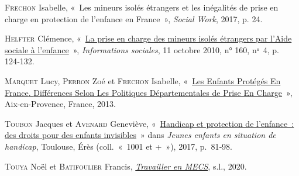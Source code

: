 \documentclass[
  12,
  a4paper,
]{report}
\newlength{\cslhangindent}
\newlength{\cslentryspacingunit} %
\newenvironment{CSLReferences}[2] %
 {%
  \setlength{\parindent}{0pt}
  \ifodd #1
  \let\oldpar\par
  \def\par{\hangindent=\cslhangindent\oldpar}
  \fi
  \setlength{\parskip}{#2\cslentryspacingunit}
 }%
 {}
\begin{document}
\hypertarget{refs}{}
\begin{CSLReferences}{0}{0}
\leavevmode{}%
\textsc{Frechon} Isabelle, {«~Les mineurs isolés étrangers et les
inégalités de prise en charge en protection de l'enfance en France~»},
\emph{Social Work}, 2017, p. 24.

\leavevmode{}%
\textsc{Helfter} Clémence,
{«~\href{http://www.cairn.info/journal-informations-sociales-2010-4-page-124.htm}{La
prise en charge des mineurs isolés étrangers par l'Aide sociale à
l'enfance}~»}, \emph{Informations sociales}, 11 octobre 2010, n° 160,
nᵒ~4, p. 124‑132.

\leavevmode{}%
\textsc{Marquet} Lucy, \textsc{Perron} Zoé et \textsc{Frechon} Isabelle,
{«~\href{https://hal.archives-ouvertes.fr/hal-02383909}{Les Enfants
Protégés En {France}. {Différences} Selon Les Politiques Départementales
de Prise En Charge}~»}, {Aix-en-Provence, France}, 2013.

\leavevmode{}%
\textsc{Toubon} Jacques et \textsc{Avenard} Geneviève,
{«~\href{https://doi.org/10.3917/eres.bauby.2017.01.0081}{Handicap et
protection de l'enfance~: des droits pour des enfants invisibles}~»}
dans \emph{Jeunes enfants en situation de handicap}, {Toulouse}, {Érès}
(coll.~{«~1001 et +~»}), 2017, p.~81‑98.

\leavevmode{}%
\textsc{Touya} Noël et \textsc{Batifoulier} Francis,
\emph{\href{https://www.cairn.info/travailler-en-mecs--9782100788330.htm}{Travailler
en MECS}}, s.l., 2020.

\end{CSLReferences}
\end{document}
